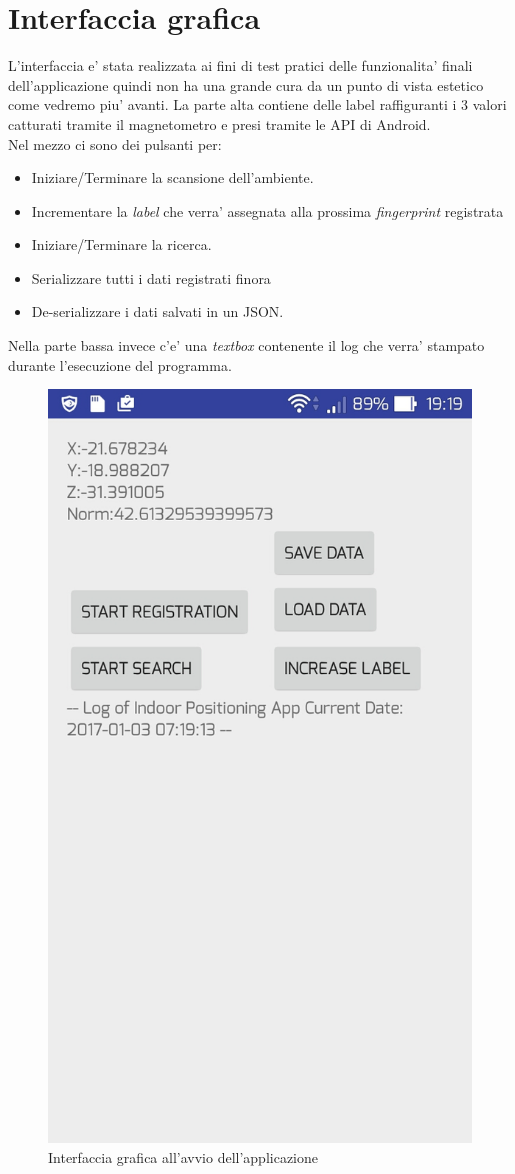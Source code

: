 \section{Interfaccia grafica}
L'interfaccia e' stata realizzata ai fini di test pratici delle funzionalita' finali dell'applicazione quindi non ha una grande cura da un punto di vista estetico come vedremo piu' avanti.
La parte alta contiene delle label raffiguranti i 3 valori catturati tramite il magnetometro e presi tramite le API di Android. \\
Nel mezzo ci sono dei pulsanti per:
\begin{itemize}
	\item Iniziare/Terminare la scansione dell'ambiente.
	\item Incrementare la \textit{label} che verra' assegnata alla prossima \textit{fingerprint} registrata
	\item Iniziare/Terminare la ricerca.
	\item Serializzare tutti i dati registrati finora
	\item De-serializzare i dati salvati in un JSON.
\end{itemize}
Nella parte bassa invece c'e' una \textit{textbox} contenente il log che verra' stampato durante l'esecuzione del programma.

\begin{figure}[H]
\centering
\includegraphics[width=0.3\linewidth]{img/app_screen}
\caption{Interfaccia grafica all'avvio dell'applicazione}
\label{fig:app_screen}
\end{figure}

